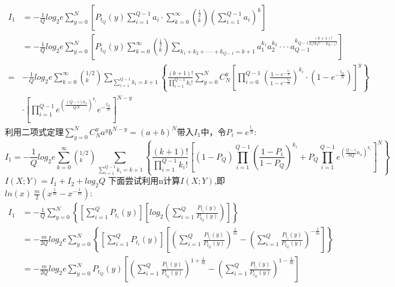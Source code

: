 \documentclass[12pt]{article}
\begin{document}
\begin{equation*}
  \begin{aligned}
    I_1 &= -\frac{1}{Q}log_2e\sum\limits_{y=0}^{N}\left[P_{t_Q}(y)\sum\limits_{i=1}^{Q-1}a_i·\sum\limits_{k=0}^{\infty}\left(^{\frac{1}{2}}_k\right)\left(\sum\limits_{i=1}^{Q-1}a_i\right)^{k}\right] \\
    &= -\frac{1}{Q}log_2e\sum\limits_{y=0}^{N}\left[P_{t_Q}(y)\sum\limits_{k=0}^{\infty}\left(^{\frac{1}{2}}_k\right)\sum\limits_{k_1+k_2+···+k_{Q-1}=k+1}a_1^{k_1}a_2^{k_2}···a_{Q-1}^{k_{Q-1}\frac{(k+1)!}{k_1!k_2!···k_{Q-1}!}}\right] \\
    =& -\frac{1}{Q}log_2e\sum\limits_{k=0}^{\infty}\left(^{1/2}_k\right)\sum\limits_{\sum_{i=1}^{Q-1}k_i=k+1}\left\{\frac{(k+1)!}{\prod_{i=1}^{Q-1}k_i!}\sum\limits_{y=0}^NC_N^y\left[\prod_{i=0}^{Q-1}\left(\frac{1-e^{-\frac{t_i}{N}}}{1-e^{-\frac{t_Q}{N}}}\right)^{k_i}·\left(1-e^{-\frac{t_Q}{N}}\right)\right]^y\right\} \\
    &·\left[\prod_{i=1}^{Q-1}e^{\left(\frac{(Q-i)n_s}{QN}\right)^{k_i}}e^{-\frac{t_Q}{N}}\right]^{N-y}
  \end{aligned}
\end{equation*}
利用二项式定理$\sum_{y=0}^NC_N^ya^yb^{N-y}=(a+b)^N$带入$I_1$中，令$P_i=e^{\frac{t_i}{N}}$:
$$I_1=-\frac{1}{Q}log_2e\sum\limits_{k=0}^\infty\left(^{1/2}_k\right)\sum\limits_{\sum_{i=1}^{Q-1}k_i=k+1}\left\{\frac{(k+1)!}{\prod_{i=1}^{Q-1}k_i!}\left[(1-P_Q)\prod_{i=1}^{Q-1}\left(\frac{1-P_i}{1-P_Q}\right)^{k_i}+P_Q\prod_{i=1}^{Q-1}e^{\left(\frac{Q-i}{NQ}n_s\right)^{k_i}}\right]^N\right\}$$
$I(X;Y)=I_1+I_2+log_2Q$
下面尝试利用n计算$I(X;Y)$,即$ln(x)~\frac{m}{2}\left(x^{\frac{1}{m}}-x^{-\frac{1}{m}}\right)$:
\begin{equation*}
  \begin{aligned}
    I_1 &= -\frac{1}{Q}\sum\limits_{y=0}^N\left\{\left[\sum\limits_{i=1}^QP_{t_i}(y)\right]\left[log_2\left(\sum\limits_{i=1}^Q\frac{P_{t_i}(y)}{P_{t_Q}(y)}\right)\right]\right\} \\
    &=-\frac{m}{2Q}log_2e\sum\limits_{y=0}^N\left\{\left[\sum\limits_{i=1}^QP_{t_i}(y)\right]\left[\left(\sum\limits_{i=1}^Q\frac{P_{t_i}(y)}{P_{t_Q}(y)}\right)^{\frac{1}{m}}-\left(\sum\limits_{i=1}^Q\frac{P_{t_i}(y)}{P_{t_Q}(y)}\right)^{-\frac{1}{m}}\right]\right\} \\
    &=-\frac{m}{2Q}log_2e\sum\limits_{y=0}^NP_{t_Q}(y)\left[\left(\sum\limits_{i=1}^Q\frac{P_{t_i}(y)}{P_{t_Q}(y)}\right)^{1+\frac{1}{m}}-\left(\sum\limits_{i=1}^Q\frac{P_{t_i}(y)}{P_{t_Q}(y)}\right)^{1-\frac{1}{m}}\right]
  \end{aligned}
\end{equation*}
\end{document}
